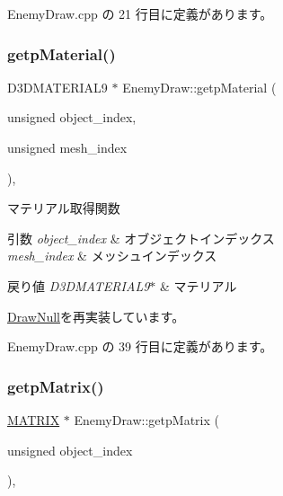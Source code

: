 Enemy\+Draw.\+cpp の 21 行目に定義があります。

\mbox{\label{class_enemy_draw_a3f2885da84533364daaaac4a801fbc46}} 
\subsubsection{\texorpdfstring{getp\+Material()}{getpMaterial()}}
{\footnotesize\ttfamily D3\+D\+M\+A\+T\+E\+R\+I\+A\+L9 $\ast$ Enemy\+Draw\+::getp\+Material (\begin{DoxyParamCaption}\item[{unsigned}]{object\+\_\+index,  }\item[{unsigned}]{mesh\+\_\+index }\end{DoxyParamCaption})\hspace{0.3cm}{\ttfamily [override]}, {\ttfamily [virtual]}}



マテリアル取得関数 


\begin{DoxyParams}{引数}
{\em object\+\_\+index} & オブジェクトインデックス \\
\hline
{\em mesh\+\_\+index} & メッシュインデックス \\
\hline
\end{DoxyParams}

\begin{DoxyRetVals}{戻り値}
{\em D3\+D\+M\+A\+T\+E\+R\+I\+A\+L9$\ast$} & マテリアル \\
\hline
\end{DoxyRetVals}


\mbox{\hyperlink{class_draw_null_a0c1efe55fea325ad277594be6fe1e938}{Draw\+Null}}を再実装しています。



 Enemy\+Draw.\+cpp の 39 行目に定義があります。

\mbox{\label{class_enemy_draw_afbb8ac19041abda280ece7737103dc66}} 
\subsubsection{\texorpdfstring{getp\+Matrix()}{getpMatrix()}}
{\footnotesize\ttfamily \mbox{\hyperlink{_matrix_8h_a032295cd9fb1b711757c90667278e744}{M\+A\+T\+R\+IX}} $\ast$ Enemy\+Draw\+::getp\+Matrix (\begin{DoxyParamCaption}\item[{unsigned}]{object\+\_\+index }\end{DoxyParamCaption})\hspace{0.3cm}{\ttfamily [override]}, {\ttfamily [virtual]}}



